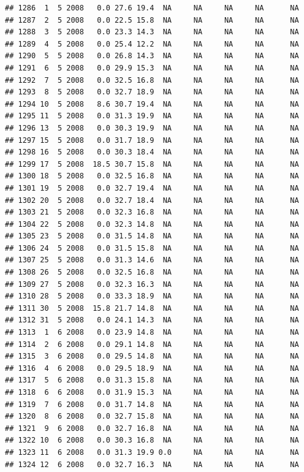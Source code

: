 \documentclass[
]{book}
\begin{document}
\begin{verbatim}
## 1286  1  5 2008   0.0 27.6 19.4  NA     NA     NA     NA      NA
## 1287  2  5 2008   0.0 22.5 15.8  NA     NA     NA     NA      NA
## 1288  3  5 2008   0.0 23.3 14.3  NA     NA     NA     NA      NA
## 1289  4  5 2008   0.0 25.4 12.2  NA     NA     NA     NA      NA
## 1290  5  5 2008   0.0 26.8 14.3  NA     NA     NA     NA      NA
## 1291  6  5 2008   0.0 29.9 15.3  NA     NA     NA     NA      NA
## 1292  7  5 2008   0.0 32.5 16.8  NA     NA     NA     NA      NA
## 1293  8  5 2008   0.0 32.7 18.9  NA     NA     NA     NA      NA
## 1294 10  5 2008   8.6 30.7 19.4  NA     NA     NA     NA      NA
## 1295 11  5 2008   0.0 31.3 19.9  NA     NA     NA     NA      NA
## 1296 13  5 2008   0.0 30.3 19.9  NA     NA     NA     NA      NA
## 1297 15  5 2008   0.0 31.7 18.9  NA     NA     NA     NA      NA
## 1298 16  5 2008   0.0 30.3 18.4  NA     NA     NA     NA      NA
## 1299 17  5 2008  18.5 30.7 15.8  NA     NA     NA     NA      NA
## 1300 18  5 2008   0.0 32.5 16.8  NA     NA     NA     NA      NA
## 1301 19  5 2008   0.0 32.7 19.4  NA     NA     NA     NA      NA
## 1302 20  5 2008   0.0 32.7 18.4  NA     NA     NA     NA      NA
## 1303 21  5 2008   0.0 32.3 16.8  NA     NA     NA     NA      NA
## 1304 22  5 2008   0.0 32.3 14.8  NA     NA     NA     NA      NA
## 1305 23  5 2008   0.0 31.5 14.8  NA     NA     NA     NA      NA
## 1306 24  5 2008   0.0 31.5 15.8  NA     NA     NA     NA      NA
## 1307 25  5 2008   0.0 31.3 14.6  NA     NA     NA     NA      NA
## 1308 26  5 2008   0.0 32.5 16.8  NA     NA     NA     NA      NA
## 1309 27  5 2008   0.0 32.3 16.3  NA     NA     NA     NA      NA
## 1310 28  5 2008   0.0 33.3 18.9  NA     NA     NA     NA      NA
## 1311 30  5 2008  15.8 21.7 14.8  NA     NA     NA     NA      NA
## 1312 31  5 2008   0.0 24.1 14.3  NA     NA     NA     NA      NA
## 1313  1  6 2008   0.0 23.9 14.8  NA     NA     NA     NA      NA
## 1314  2  6 2008   0.0 29.1 14.8  NA     NA     NA     NA      NA
## 1315  3  6 2008   0.0 29.5 14.8  NA     NA     NA     NA      NA
## 1316  4  6 2008   0.0 29.5 18.9  NA     NA     NA     NA      NA
## 1317  5  6 2008   0.0 31.3 15.8  NA     NA     NA     NA      NA
## 1318  6  6 2008   0.0 31.9 15.3  NA     NA     NA     NA      NA
## 1319  7  6 2008   0.0 31.7 14.8  NA     NA     NA     NA      NA
## 1320  8  6 2008   0.0 32.7 15.8  NA     NA     NA     NA      NA
## 1321  9  6 2008   0.0 32.7 16.8  NA     NA     NA     NA      NA
## 1322 10  6 2008   0.0 30.3 16.8  NA     NA     NA     NA      NA
## 1323 11  6 2008   0.0 31.3 19.9 0.0     NA     NA     NA      NA
## 1324 12  6 2008   0.0 32.7 16.3  NA     NA     NA     NA      NA

\end{verbatim}
\end{document}
